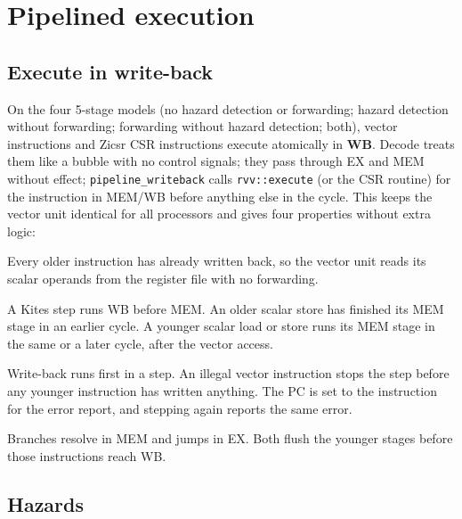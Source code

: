 \documentclass[11pt]{article}
\begin{document}
\section{Pipelined execution}\label{sec:pipeline}

\subsection{Execute in write-back}

On the four 5-stage models (no hazard detection or forwarding; hazard detection without
forwarding; forwarding without hazard detection; both), vector instructions and Zicsr CSR
instructions execute atomically in \textbf{WB}. Decode treats them like a bubble with no control
signals; they pass through EX and MEM without effect; \texttt{pipeline\_writeback} calls
\texttt{rvv::execute} (or the CSR routine) for the instruction in MEM/WB before anything else in
the cycle. This keeps the vector unit identical for all processors and gives four properties
without extra logic:

\begin{description}[style=nextline,leftmargin=0.6cm,font=\sffamily\bfseries\color{kblue}]
\item[Scalar operands are current.] Every older instruction has already written back, so the
  vector unit reads its scalar operands from the register file with no forwarding.
\item[Memory order is program order.] A Kites step runs WB before MEM. An older scalar store has
  finished its MEM stage in an earlier cycle. A younger scalar load or store runs its MEM stage in
  the same or a later cycle, after the vector access.
\item[Exceptions are precise.] Write-back runs first in a step. An illegal vector instruction
  stops the step before any younger instruction has written anything. The PC is set to the
  instruction for the error report, and stepping again reports the same error.
\item[Wrong-path instructions never execute.] Branches resolve in MEM and jumps in EX. Both flush
  the younger stages before those instructions reach WB.
\end{description}

\subsection{Hazards}
\end{document}
